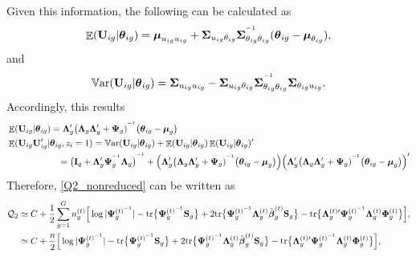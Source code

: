 \documentclass[12pt]{article}
\newcommand{\vecI}{\mathbf{I}}
\newcommand{\inv}{^{\raisebox{.2ex}{$\scriptscriptstyle-1$}}}
\DeclareMathOperator{\E}{\mathbb{E}}
\begin{document}
\noindent Given this information, the following can be calculated as $$\E(\mathbf{U}_{ig} | \boldsymbol{\theta}_{ig}) = \boldsymbol{\mu}_{u_{ig}u_{ig}} + \boldsymbol{\Sigma}_{u_{ig} \theta_{ig}}\boldsymbol{\Sigma}_{\theta_{ig}\theta_{ig}}^{\inv}(\boldsymbol{\theta}_{ig} - \boldsymbol{\mu}_{\theta_{ig}}),$$ and $$\mathbb{V}\text{ar}(\mathbf{U}_{ig} | \boldsymbol{\theta}_{ig}) = \boldsymbol{\Sigma}_{u_{ig}u_{ig}} - \boldsymbol{\Sigma}_{u_{ig}\theta_{ig}}\boldsymbol{\Sigma}_{\theta_{ig}\theta_{ig}}^{\inv}\boldsymbol{\Sigma}_{\theta_{ig} u_{ig}}.$$ Accordingly, this results
\begin{equation*}
\begin{split}
& \E(\mathbf{U}_{ig} | \boldsymbol{\theta}_{ig}) = \mathbf{\Lambda}_g^{\prime} \big(\mathbf{\Lambda}_g \mathbf{\Lambda}_g^{\prime} + \mathbf{\Psi}_g)^{\inv}  \big(\boldsymbol{\theta}_{ig} - \boldsymbol{\mu}_g \big)  \\
& \E(\mathbf{U}_{ig}  \mathbf{U}_{ig}^{\prime} | \boldsymbol{\theta}_{ig}, z_{i} =1) = \mathbb{V}\text{ar} (\mathbf{U}_{ig} |\boldsymbol{\theta}_{ig}) + \E(\mathbf{U}_{ig} |\boldsymbol{\theta}_{ig}) \E(\mathbf{U}_{ig} |\boldsymbol{\theta}_{ig})^{\prime} \\
& \hspace{20mm} = \big(\vecI_q + \mathbf{\Lambda}_g^{\prime}  \mathbf{\Psi}_g^{\inv} \mathbf{\Lambda}_g \big)^{\inv} +  
\Big( \mathbf{\Lambda}_g^{\prime} \big(\mathbf{\Lambda}_g \mathbf{\Lambda}_g^{\prime} + \mathbf{\Psi}_g)^{\inv}  \big(\boldsymbol{\theta}_{ig} - \boldsymbol{\mu}_g \big)\Big) \Big( \mathbf{\Lambda}_g^{\prime} \big(\mathbf{\Lambda}_g \mathbf{\Lambda}_g^{\prime} + \mathbf{\Psi}_g)^{\inv}  \big(\boldsymbol{\theta}_{ig} - \boldsymbol{\mu}_g \big) \Big)^{\prime} 
 \end{split}
\end{equation*} 
Therefore, \eqref{Q2_nonreduced} can be written as 
\begin{equation}
\label{Q2_reduced}
\begin{split}
\mathcal{Q}_2 & \simeq C + \frac{1}{2} \sum_{g=1}^G n_g^{(t)} \Big[ \log |\mathbf{\Psi}_g^{(t) \inv}| - \text{tr} \big\{\mathbf{\Psi}_g^{(t) \inv} \mathbf{S}_g\big\} + 2 \text{tr} \big\{\mathbf{\Psi}_g^{(t) \inv} \mathbf{\Lambda}_g^{(t)} \hat{\boldsymbol{\beta}}_g^{(t)} \mathbf{S}_g \big\} - \text{tr}\big\{\mathbf{\Lambda}_g^{(t) \prime} \mathbf{\Psi}_g^{(t) \inv} \mathbf{\Lambda}_g^{(t)}  \mathbf{\Phi}_g^{(t)} \big\} \Big], \\
& \simeq C + \frac{n}{2} \Big[ \log |\mathbf{\Psi}_g^{(t) \inv}| - \text{tr} \big\{\mathbf{\Psi}_g^{(t) \inv} \mathbf{S}_g\big\} + 2 \text{tr} \big\{\mathbf{\Psi}_g^{(t) \inv} \mathbf{\Lambda}_g^{(t)}  \hat{\boldsymbol{\beta}}_g^{(t)} \mathbf{S}_g \big\} - \text{tr}\big\{\mathbf{\Lambda}_g^{(t) \prime} \mathbf{\Psi}_g^{(t) \inv} \mathbf{\Lambda}_g^{(t)}  \mathbf{\Phi}_g^{(t)}  \big\} \Big],
\end{split}
\end{equation} 
\end{document}
